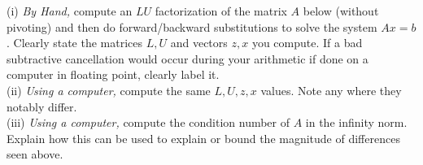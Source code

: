 \documentclass[11pt]{article}
\begin{document}
    \noindent (i) {\it By Hand,} compute an $LU$ factorization of the matrix $A$ below (without pivoting) and then do forward/backward substitutions to solve the system $Ax = b$. Clearly state the matrices $L,U$ and vectors $z,x$ you compute. If a bad subtractive cancellation would occur during your arithmetic if done on a computer in floating point, clearly label it.\\

    \noindent (ii) {\it Using a computer,} compute the same $L,U,z,x$ values. Note any where they notably differ.\\

    \noindent (iii) {\it Using a computer,} compute the condition number of $A$ in the infinity norm. Explain how this can be used to explain or bound the magnitude of differences seen above.

    
\end{document}

